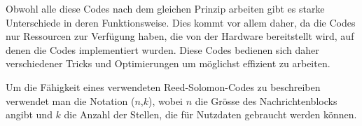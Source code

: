 Obwohl alle diese Codes nach dem gleichen Prinzip arbeiten gibt es starke Unterschiede in deren Funktionsweise. 
Dies kommt vor allem daher, da die Codes nur Ressourcen zur Verfügung haben, die von der Hardware bereitstellt wird,  auf denen die Codes implementiert wurden.
Diese Codes bedienen sich daher verschiedener Tricks und Optimierungen um möglichst effizient zu arbeiten.

Um die Fähigkeit eines verwendeten Reed-Solomon-Codes zu beschreiben verwendet man die Notation ($n$,$k$), wobei $n$ die Grösse des Nachrichtenblocks angibt und $k$ die Anzahl der Stellen, die für Nutzdaten gebraucht werden können.

%
%
%
%
%
%
%
%
%
%
%
%
%

